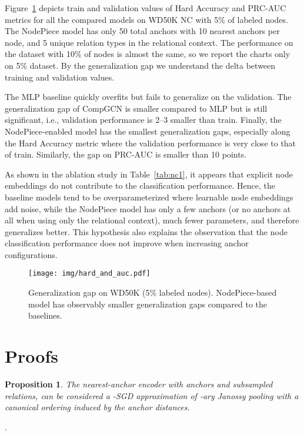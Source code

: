 \documentclass{article} \usepackage{iclr2022_conference,times}
\newtheorem{proposition}{Proposition}
\newcommand{\xhdr}[1]{\noindent{\bfseries #1}.}
\begin{document}
Figure~\ref{fig:app_generalization} depicts train and validation values of Hard Accuracy and PRC-AUC metrics for all the compared models on WD50K NC with 5\% of labeled nodes. 
The NodePiece model has only 50 total anchors with 10 nearest anchors per node, and 5 unique relation types in the relational context.
The performance on the dataset with 10\% of nodes is almost the same, so we report the charts only on 5\% dataset.
By the generalization gap we understand the delta between training and validation values.

The MLP baseline quickly overfits but fails to generalize on the validation. 
The generalization gap of CompGCN is smaller compared to MLP but is still significant, i.e., validation performance is 2--3 smaller than train.
Finally, the NodePiece-enabled model has the smallest generalization gaps, especially along the Hard Accuracy metric where the validation performance is very close to that of train. 
Similarly, the gap on PRC-AUC is smaller than 10 points.

As shown in the ablation study in Table~\ref{tab:nc1}, it appears that explicit node embeddings do not contribute to the classification performance. 
Hence, the baseline models tend to be overparameterized where learnable node embeddings add noise, while the NodePiece model has only a few anchors (or no anchors at all when using only the relational context), much fewer parameters, and therefore generalizes better. 
This hypothesis also explains the observation that the node classification performance does not improve when increasing  anchor configurations.

\begin{figure}[!t]
    \centering
    \texttt{[image: img/hard\_and\_auc.pdf]}
    \caption{Generalization gap on WD50K (5\% labeled nodes). NodePiece-based model has observably smaller generalization gaps compared to the baselines. }
    \label{fig:app_generalization}
\end{figure}


\section{Proofs}
\label{app:proofs}

\begin{proposition}\label{thm:app_main}
The nearest-anchor encoder with  anchors and  subsampled relations, can be considered a -SGD approximation of -ary Janossy pooling with a canonical ordering induced by the anchor distances.
\end{proposition}
\xhdr{Proof} 
\end{document}
